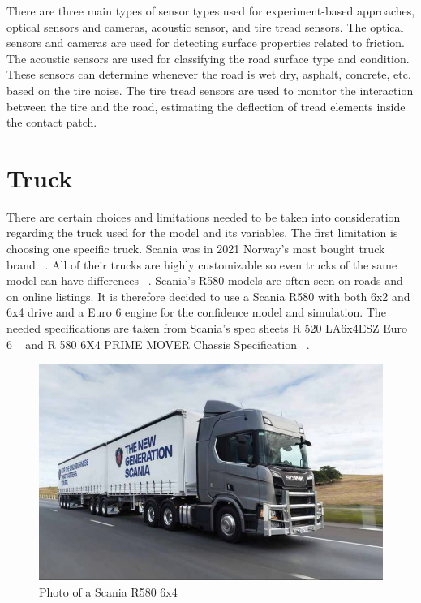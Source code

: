 \documentclass[noprint]{uit-thesis}
\begin{document}
There are three main types of sensor types used for experiment-based approaches, optical sensors and cameras, acoustic sensor, and tire tread sensors. The optical sensors and cameras are used for detecting surface properties related to friction. The acoustic sensors are used for classifying the road surface type and condition. These sensors can determine whenever the road is wet dry, asphalt, concrete, etc. based on the tire noise. The tire tread sensors are used to monitor the interaction between the tire and the road, estimating the deflection of tread elements inside the contact patch. 



\section{Truck}
There are certain choices and limitations needed to be taken into consideration regarding the truck used for the model and its variables. The first limitation is choosing one specific truck. Scania was in 2021 Norway’s most bought truck brand ~\citep{2021Truck}. All of their trucks are highly customizable so even trucks of the same model can have differences ~\citep{Scania}. Scania’s R580 models are often seen on roads and on online listings. It is therefore decided to use a Scania R580 with both 6x2 and 6x4 drive and a Euro 6 engine for the confidence model and simulation. The needed specifications are taken from Scania’s spec sheets R 520 LA6x4ESZ Euro 6 ~\citep{R520} and R 580 6X4 PRIME MOVER Chassis Specification ~\citep{R580}.
\par
\begin{figure}[H]
\includegraphics[width=\textwidth]{./photo/R580.JPG}
\caption{Photo of a Scania R580 6x4 ~\citep{R580}}
\label{fig:R580}
\end{figure}
\end{document}
